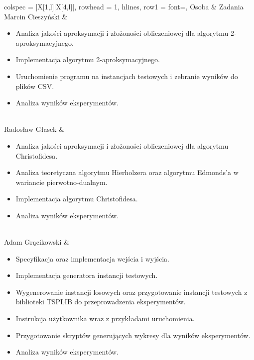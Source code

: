 \documentclass{article}
\theoremstyle{definition}
\theoremstyle{plain}
\theoremstyle{remark}
\begin{document}
\begin{tblr}[
	caption = {Podział pracy w zespole.},
	label   = {tab:podzial-pracy},
	]{
		colspec = {|X[1,l]|X[4,l]|},
		rowhead = 1,
		hlines,
		row{1}  = {font=\bfseries},
	}
	Osoba & Zadania \\
	Marcin Cieszyński &
	\begin{minipage}[t]{\linewidth}
		\begin{itemize}[nosep, leftmargin=*, topsep=2pt]
			\item Analiza jakości aproksymacji i złożoności obliczeniowej dla algorytmu 2-aproksymacyjnego.
			\item Implementacja algorytmu 2-aproksymacyjnego.
			\item Uruchomienie programu na instancjach testowych i zebranie wyników do plików CSV.
			\item Analiza wyników eksperymentów.
		\end{itemize}
	\end{minipage} \\
	Radosław Głasek &
	\begin{minipage}[t]{\linewidth}
		\begin{itemize}[nosep, leftmargin=*, topsep=2pt]
			\item Analiza jakości aproksymacji i złożoności obliczeniowej dla algorytmu Christofidesa.
			\item Analiza teoretyczna algorytmu Hierholzera oraz algorytmu Edmonds'a w wariancie pierwotno-dualnym.
			\item Implementacja algorytmu Christofidesa.
			\item Analiza wyników eksperymentów.
		\end{itemize}
	\end{minipage} \\
	Adam Grącikowski &
	\begin{minipage}[t]{\linewidth}
		\begin{itemize}[nosep, leftmargin=*, topsep=2pt]
			\item Specyfikacja oraz implementacja wejścia i wyjścia.
			\item Implementacja generatora instancji testowych.
			\item Wygenerowanie instancji losowych oraz przygotowanie instancji testowych z biblioteki TSPLIB do przeprowadzenia eksperymentów.
			\item Instrukcja użytkownika wraz z przykładami uruchomienia.
			\item Przygotowanie skryptów generujących wykresy dla wyników eksperymentów.
			\item Analiza wyników eksperymentów.
		\end{itemize}
	\end{minipage} \\
\end{tblr}

\newpage
\printbibliography
\end{document}
